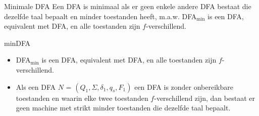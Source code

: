 \newpage

\begin{theo}{Minimale DFA}
    Een DFA is minimaal als er geen enkele andere DFA bestaat die dezelfde taal bepaalt en minder toestanden heeft, m$.$a$.$w$.$ 
    DFA$_{\text{min}}$ is een DFA, equivalent met DFA, en alle toestanden zijn $f$-verschillend.
    \vspace{-0.3cm}
\end{theo}

\begin{lem}{minDFA}
    \begin{itemize}
        \item DFA$_{\text{min}}$ is een DFA, equivalent met DFA, en alle toestanden zijn $f$-verschillend.
        \item Als een DFA $N$ = $(Q_1,\Sigma, \delta_1, q_s, F_1)$  een DFA is zonder onbereikbare toestanden en waarin elke twee toestanden $f$-verschillend zijn, 
        dan bestaat er geen machine met strikt minder toestanden die dezelfde taal bepaalt.
    \end{itemize}
\end{lem}

